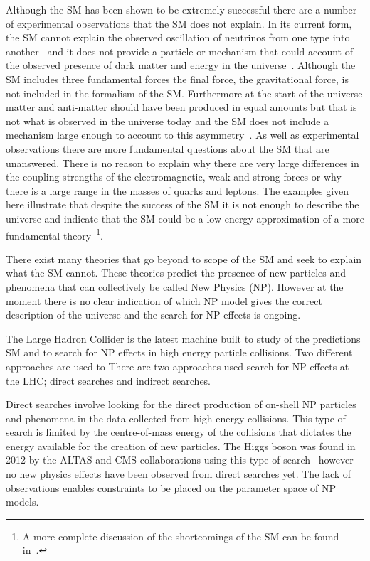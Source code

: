 Although the SM has been shown to be extremely successful there are a number of experimental observations that the SM does not explain. In its current form, the SM cannot explain the observed oscillation of neutrinos from one type into another~\cite{PhysRevLett.20.1205,Fukuda:1998fd, PhysRevLett.86.5656,PhysRevLett.87.071301} and it does not provide a particle or mechanism that could account of the observed presence of dark matter and energy in the universe~\cite{darkmatter1,darkmatter2,Dunkley:2008ie,Ade:2015xua}. Although the SM includes three fundamental forces the final force, the gravitational force, is not included in the formalism of the SM. Furthermore at the start of the universe matter and anti-matter should have been produced in equal amounts but that is not what is observed in the universe today and the SM does not include a mechanism large enough to account to this asymmetry~\cite{Sakharov:1967dj,Gavela:1993ts}.
As well as experimental observations there are more fundamental questions about the SM that are unanswered. There is no reason to explain why there are very large differences in the coupling strengths of the electromagnetic, weak and strong forces or why there is a large range in the masses of quarks and leptons.
The examples given here illustrate that despite the success of the SM it is not enough to describe the universe and indicate that the SM could be a low energy approximation of a more fundamental theory~\cite{lowenergySM}\footnote{A more complete discussion of the shortcomings of the SM can be found in~\cite{Ellis:2002wba}.}.

There exist many theories that go beyond to scope of the SM and seek to explain what the SM cannot. These theories predict the presence of new particles and phenomena that can collectively be called New Physics (NP). However at the moment there is no clear indication of which NP model gives the correct description of the universe and the search for NP effects is ongoing.

The Large Hadron Collider is the latest machine built to study of the predictions SM and to search for NP effects in high energy particle collisions. Two different approaches are used to There are two approaches used search for NP effects at the LHC; direct searches and indirect searches.




Direct searches involve looking for the direct production of on-shell NP particles and phenomena in the data collected from high energy collisions. 
This type of search is limited by the centre-of-mass energy of the collisions that dictates the energy available for the creation of new particles. 
The Higgs boson was found in 2012 by the ALTAS and CMS collaborations using this type of search~\cite{Chatrchyan:2012xdj,Aad:2012tfa} however no new physics effects have been observed from direct searches yet. The lack of observations enables constraints to be placed on the parameter space of NP models.


